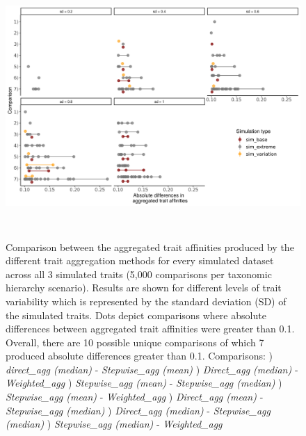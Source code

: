 \documentclass{article}
\begin{document}
\begin{figure}[H]
  \centering
  \includegraphics[width=16.5cm, height=10cm]{Diffs_indiv_runs_sim.png}
  \caption{Comparison between the aggregated trait affinities produced by the different trait aggregation methods for every simulated dataset across all 3 simulated traits (5,000 comparisons per taxonomic hierarchy scenario). Results are shown for different levels of trait variability which is represented by the standard deviation (SD) of the simulated traits. Dots depict comparisons where absolute differences between aggregated trait affinities were greater than 0.1. Overall, there are 10 possible unique comparisons of which 7 produced absolute differences greater than 0.1. \newline
  Comparisons: ) \textit{direct\_agg (median)} - \textit{Stepwise\_agg (mean)} ) \textit{Direct\_agg (median)} - \textit{Weighted\_agg} ) \textit{Stepwise\_agg (mean)} - \textit{Stepwise\_agg (median)} ) \textit{Stepwise\_agg (mean)} - \textit{Weighted\_agg} ) \textit{Direct\_agg (mean)} - \textit{Stepwise\_agg (median)} ) \textit{Direct\_agg (median)} - \textit{Stepwise\_agg (median)} ) \textit{Stepwise\_agg (median)} - \textit{Weighted\_agg} \newline
  }
  \label{fig:sim_indv_runs}
\end{figure}
\end{document}

